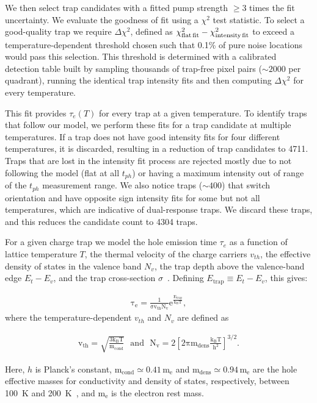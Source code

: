 \documentclass[aps, prapplied,twocolumn,showpacs,superscriptaddress,preprintnumbers, longbibliography,nofootinbib,floatfix]{revtex4-2}
\begin{document}
We then select trap candidates with a fitted pump strength $\ge3$ times the fit uncertainty. 
We evaluate the goodness of fit using a $\chi^2$ test statistic. 
To select a good-quality trap we require $\Delta \chi^2$, defined as $\chi^2_{\text{flat\,fit}} - \chi^2_{\text{intensity\,fit}}$ to exceed a temperature-dependent threshold chosen such that 0.1\% of pure noise locations would pass this selection. 
This threshold is determined with a calibrated detection table built by sampling thousands of trap-free pixel pairs ($\sim2000$ per quadrant), running the identical trap intensity fits and then computing $\Delta \chi^2$ for every temperature.

This fit provides $\tau_e(T)$ for every trap at a given temperature. 
To identify traps that follow our model, we perform these fits for a trap candidate at multiple temperatures. 
If a trap does not have good intensity fits for four different temperatures, it is discarded, resulting in a reduction of trap candidates to 4711. 
Traps that are lost in the intensity fit process are rejected mostly due to not following the model (flat at all $t_{ph}$) or having a maximum intensity out of range of the $t_{ph}$ measurement range. 
We also notice traps ($\sim400$) that switch orientation and have opposite sign intensity fits for some but not all temperatures, which are indicative of dual-response traps. 
We discard these traps, and this reduces the candidate count to 4304 traps.

For a given charge trap we model the hole emission time $\tau_e$ as a function of lattice temperature $T$, the thermal velocity of the charge carriers $v_{th}$, the effective density of states in the valence band $N_v$, the trap depth above the valence-band edge $E_t-E_v$, and the trap cross-section $\sigma$~\cite{PhysRev.87.835,trapsOscura,HallPc,Brusco:2025kus}. 
Defining $E_{\mathrm{trap}}\equiv E_t-E_v$, this gives:

\begin{align}\label{eq:tau(T)}
    \mathrm{\tau_e = \frac{1}{\sigma v_{th}N_v}e^{\frac{E_{\mathrm{trap}}}{k_B T}}},
\end{align}
where the temperature-dependent $v_{th}$ and $N_v$ are defined as

\begin{align}
    \mathrm{v_{th} = \sqrt{\frac{3k_B T}{m_{cond}}}~~~and~~~
    N_v = 2 \left[ 2\pi m_{dens} \frac{k_B T}{h^2}\right]^{3/2}}.
\end{align}

\noindent Here, $h$ is Planck's constant, $\mathrm{m_{cond} \simeq 0.41\,m_e}$ and $\mathrm{m_{dens} \simeq 0.94\,m_e}$ are the hole effective masses for conductivity and density of states, respectively, between 100~K and 200~K~\cite{GreenCon}, and $\mathrm{m_e}$ is the electron rest mass.
\end{document}
